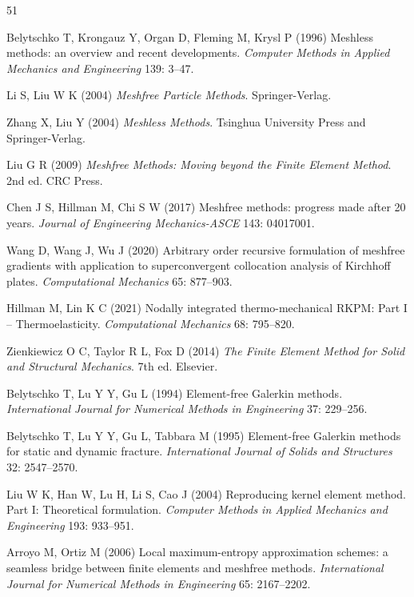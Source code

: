 \begin{thebibliography}{51}

 Belytschko T, Krongauz Y, Organ D, Fleming M, Krysl P (1996) Meshless methods: an overview and recent developments. \emph{Computer Methods in Applied Mechanics and Engineering} 139: 3--47.

 Li S, Liu W K (2004) \emph{Meshfree Particle Methods}. Springer-Verlag.

 Zhang X, Liu Y (2004) \emph{Meshless Methods}. Tsinghua University Press and Springer-Verlag.

 Liu G R (2009) \emph{Meshfree Methods: Moving beyond the Finite Element Method}. 2nd ed. CRC Press.

 Chen J S, Hillman M, Chi S W (2017) Meshfree methods: progress made after 20 years. \emph{Journal of Engineering Mechanics-ASCE} 143: 04017001.

 Wang D, Wang J, Wu J (2020) Arbitrary order recursive formulation of meshfree gradients with application to superconvergent collocation analysis of {Kirchhoff} plates. \emph{Computational Mechanics} 65: 877--903.

 Hillman M, Lin K C (2021) Nodally integrated thermo-mechanical {RKPM}: {Part I} -- Thermoelasticity. \emph{Computational Mechanics} 68: 795--820.

 Zienkiewicz O C, Taylor R L, Fox D (2014) \emph{The Finite Element Method for Solid and Structural Mechanics}. 7th ed. Elsevier.

 Belytschko T, Lu Y Y, Gu L (1994) Element-free {Galerkin} methods. \emph{International Journal for Numerical Methods in Engineering} 37: 229--256.

 Belytschko T, Lu Y Y, Gu L, Tabbara M (1995) Element-free {Galerkin} methods for static and dynamic fracture. \emph{International Journal of Solids and Structures} 32: 2547--2570.

 Liu W K, Han W, Lu H, Li S, Cao J (2004) Reproducing kernel element method. {Part I}: Theoretical formulation. \emph{Computer Methods in Applied Mechanics and Engineering} 193: 933--951.

 Arroyo M, Ortiz M (2006) Local maximum-entropy approximation schemes: a seamless bridge between finite elements and meshfree methods. \emph{International Journal for Numerical Methods in Engineering} 65: 2167--2202.


\end{thebibliography}
